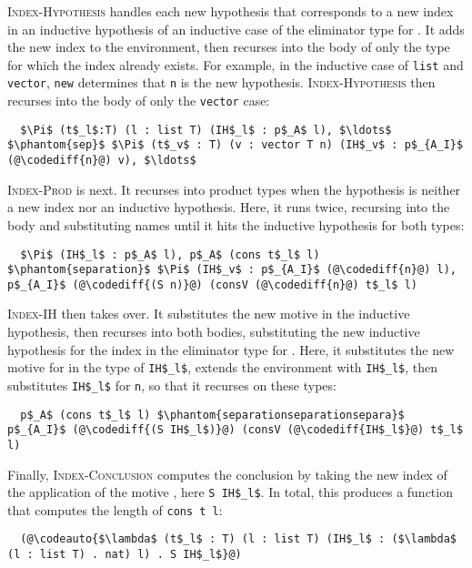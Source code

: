 \textsc{Index-Hypothesis} handles each new hypothesis that corresponds to a new index in an inductive hypothesis
of an inductive case of the eliminator type for \AI. It adds the new index to the environment, then recurses into the body of only the
type for which the index already exists. For example, in the inductive case of \lstinline{list} and \lstinline{vector},
\lstinline{new} determines that \lstinline{n} is the new hypothesis.
\textsc{Index-Hypothesis} then recurses into the body of only the \lstinline{vector} case:
\begin{lstlisting}
  $\Pi$ (t$_l$:T) (l : list T) (IH$_l$ : p$_A$ l), $\ldots$ $\phantom{sep}$ $\Pi$ (t$_v$ : T) (v : vector T n) (IH$_v$ : p$_{A_I}$ (@\codediff{n}@) v), $\ldots$
\end{lstlisting}
\textsc{Index-Prod} is next. It recurses into product types when the hypothesis is neither a new index nor an inductive hypothesis. Here, it runs twice, recursing into the body and substituting names %
until it hits the inductive hypothesis for both types:
\begin{lstlisting}
  $\Pi$ (IH$_l$ : p$_A$ l), p$_A$ (cons t$_l$ l) $\phantom{separation}$ $\Pi$ (IH$_v$ : p$_{A_I}$ (@\codediff{n}@) l),  p$_{A_I}$ (@\codediff{(S n)}@) (consV (@\codediff{n}@) t$_l$ l)
\end{lstlisting}
\textsc{Index-IH} then takes over. It substitutes the new motive in the inductive hypothesis, then recurses into both bodies, 
substituting the new inductive hypothesis for the index in the eliminator type for \AI.
Here, it substitutes the new motive
for  in the type of \lstinline{IH$_l$}, extends the environment with \lstinline{IH$_l$}, then 
substitutes \lstinline{IH$_l$} for \lstinline{n}, so that it recurses on these types:
\begin{lstlisting}
  p$_A$ (cons t$_l$ l) $\phantom{separationseparationsepara}$ p$_{A_I}$ (@\codediff{(S IH$_l$)}@) (consV (@\codediff{IH$_l$}@) t$_l$ l)
\end{lstlisting}
Finally, \textsc{Index-Conclusion} computes the conclusion by taking the new index of the application of the motive ,
here \lstinline{S IH$_l$}.
In total, this produces a function 
that computes the length of \lstinline{cons t l}:
\begin{lstlisting}
  (@\codeauto{$\lambda$ (t$_l$ : T) (l : list T) (IH$_l$ : ($\lambda$ (l : list T) . nat) l) . S IH$_l$}@)
\end{lstlisting}

